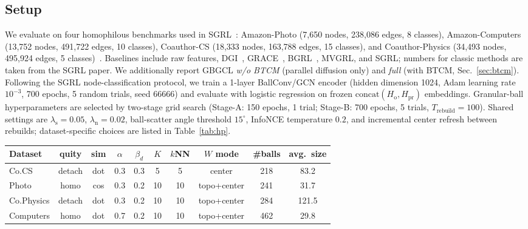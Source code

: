\documentclass[conference]{IEEEtran}
\begin{document}
\subsection{Setup}
We evaluate on four homophilous benchmarks used in SGRL~\cite{he2024sgrl}: Amazon-Photo (7,650 nodes, 238,086 edges, 8 classes), Amazon-Computers (13,752 nodes, 491,722 edges, 10 classes), Coauthor-CS (18,333 nodes, 163,788 edges, 15 classes), and Coauthor-Physics (34,493 nodes, 495,924 edges, 5 classes)~\cite{luo2024tunedgnn}.
Baselines include raw features, DGI~\cite{velickovic2019dgi}, GRACE~\cite{zhu2020grace}, BGRL~\cite{thakoor2021bgrl}, MVGRL, and SGRL; numbers for classic methods are taken from the SGRL paper.
We additionally report GBGCL \emph{w/o BTCM} (parallel diffusion only) and \emph{full} (with BTCM, Sec.~\ref{sec:btcm}).
Following the SGRL node-classification protocol, we train a 1-layer BallConv/GCN encoder (hidden dimension 1024, Adam learning rate $10^{-3}$, 700 epochs, 5 random trials, seed 66666) and evaluate with logistic regression on frozen $\mathrm{concat}(H_{\mathrm{o}},H_{\mathrm{pr}})$ embeddings.
Granular-ball hyperparameters are selected by two-stage grid search (Stage-A: 150 epochs, 1 trial; Stage-B: 700 epochs, 5 trials, $T_{\mathrm{rebuild}}{=}100$).
Shared settings are $\lambda_{\mathrm{s}}{=}0.05$, $\lambda_{\mathrm{n}}{=}0.02$, ball-scatter angle threshold $15^{\circ}$, InfoNCE temperature $0.2$, and incremental center refresh between rebuilds; dataset-specific choices are listed in Table~\ref{tab:hp}.
\begin{strip}
  \centering
  \footnotesize
  \setlength{\tabcolsep}{3pt}
  \label{tab:hp}
  \begin{tabular}{lccccccccc}
    \toprule
    Dataset & quity & sim & $\alpha$ & $\beta_d$ & $K$ & $k$NN & $W$ mode & \#balls & avg.\ size \\
    \midrule
    Co.CS      & detach & dot & 0.3 & 0.3 & 5  & 5  & center       & 218 & 83.2 \\
    Photo      & homo   & cos & 0.3 & 0.2 & 10 & 10 & topo+center  & 241 & 31.7 \\
    Co.Physics & detach & dot & 0.3 & 0.2 & 10 & 10 & topo+center  & 284 & 121.5 \\
    Computers  & homo   & dot & 0.7 & 0.2 & 10 & 10 & topo+center  & 462 & 29.8 \\
    \bottomrule
  \end{tabular}
\end{strip}
\end{document}
